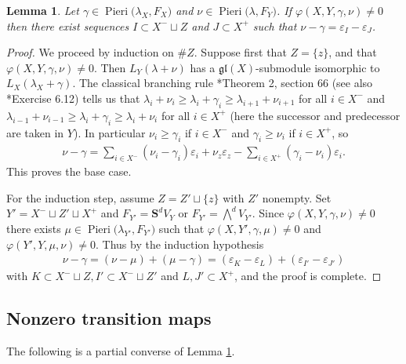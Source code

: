 \documentclass[11pt,fleqn]{amsart}
\renewcommand\phi{\varphi}
\renewcommand\epsilon{\varepsilon}
\newtheorem{lem}[thm]{Lemma}
\theoremstyle{definition}
\theoremstyle{remark}
\theoremstyle{remark}
\newcommand\gl{\mathfrak{gl}}
\renewcommand\SS{\mathbf S}
\newcommand\Pieri[2]{\operatorname{Pieri}{(#1},{#2)}}
\newcommand\map[4]{\phi(#3,#4,#1,#2)}
\begin{document}
\begin{lem}
\label{lem:nonzero-necessary}
Let $\gamma \in \Pieri{\lambda_X}{F_X}$ and $\nu 
\in \Pieri{\lambda}{F_Y}$. If $\map{\gamma}{\nu}{X}{Y} \neq 0$ then there exist 
sequences $I \subset X^- \sqcup Z$ and $J \subset X^+$ such that $\nu - \gamma
= \epsilon_I - \epsilon_J$.
\end{lem}
\begin{proof}
We proceed by induction on $\# Z$. Suppose first that $Z = \{z\}$, and that
$\map{\gamma}{\nu}{X}{Y} \neq 0$. Then $L_Y(\lambda + \nu)$ has a 
$\gl(X)$-submodule isomorphic to $L_X(\lambda_X + \gamma)$. The 
classical branching rule \cite{Zhelobenko73}*{Theorem 2, section 66} (see also 
\cite{FH91}*{Exercise 6.12}) tells us that $\lambda_i + \nu_i \geq 
\lambda_i + \gamma_i \geq \lambda_{i+1} + \nu_{i+1}$ for all $i \in X^-$ and 
$\lambda_{i-1} + \nu_{i-1} \geq \lambda_i + \gamma_i \geq \lambda_i + \nu_i$ 
for all $i \in X^+$ (here the successor and predecessor are taken in $Y$). In 
particular $\nu_i \geq \gamma_i$ if $i \in X^-$ and $\gamma_i \geq \nu_{i}$ if 
$i \in X^+$, so
\begin{align*}
  \nu - \gamma = \sum_{i \in X^-} (\nu_i - \gamma_i) \epsilon_i
    + \nu_z \epsilon_z - \sum_{i \in X^+} (\gamma_i - \nu_i) \epsilon_i.
\end{align*}
This proves the base case.

For the induction step, assume $Z = Z' \sqcup \{z\}$ with $Z'$ nonempty. Set 
$Y' = X^- \sqcup Z' \sqcup X^+$ and $F_{Y'} = \SS^dV_Y$ or $F_{Y'} = 
\bigwedge^d V_{Y'}$. Since $\map{\gamma}{\nu}{X}{Y} \neq 0$ there exists $\mu 
\in \Pieri{\lambda_{Y'}}{F_{Y'}}$ such that $\map{\gamma}{\mu}{X}{Y'} \neq 0$ 
and $\map{\mu}{\nu}{Y'}{Y} \neq 0$. Thus by the induction hypothesis
\begin{align*}
\nu - \gamma 
  = (\nu - \mu) + (\mu - \gamma) 
  = (\epsilon_{K} - \epsilon_L) + (\epsilon_{I'} - \epsilon_{J'})  
\end{align*}
with $K \subset X^- \sqcup Z, I' \subset X^- \sqcup Z'$ and $L, J' \subset 
X^+$, and the proof is complete.
\end{proof}

\subsection{Nonzero transition maps}
The following is a partial converse of Lemma \ref{lem:nonzero-necessary}.
\end{document}
